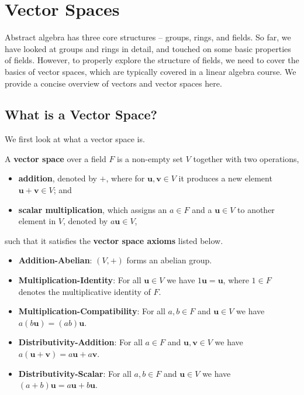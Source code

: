 \chapter{Vector Spaces}
Abstract algebra has three core structures -- groups, rings, and fields. So far, we have looked at groups and rings in detail, and touched on some basic properties of fields. However, to properly explore the structure of fields, we need to cover the basics of vector spaces, which are typically covered in a linear algebra course. We provide a concise overview of vectors and vector spaces here.

\section{What is a Vector Space?}
We first look at what a vector space is.
\begin{definition}
    A \textbf{vector space} over a field $F$ is a non-empty set $V$ together with two operations,
    \begin{itemize}
        \item \textbf{addition}, denoted by $+$, where for $\textbf{u}, \textbf{v} \in V$ it produces a new element $\textbf{u} + \textbf{v} \in V$; and
        \item \textbf{scalar multiplication}, which assigns an $a \in F$ and a $\textbf{u} \in V$ to another element in $V$, denoted by $a\textbf{u} \in V$,
    \end{itemize}
    such that it satisfies the \textbf{vector space axioms} listed below.
    \begin{itemize}
        \item \textbf{Addition-Abelian}: $(V, +)$ forms an abelian group.
        \item \textbf{Multiplication-Identity}: For all $\textbf{u} \in V$ we have $1\textbf{u} = \textbf{u}$, where $1 \in F$ denotes the multiplicative identity of $F$.
        \item \textbf{Multiplication-Compatibility}: For all $a,b  \in F$ and $\textbf{u} \in V$ we have $a(b\textbf{u}) = (ab)\textbf{u}$.
        \item \textbf{Distributivity-Addition}: For all $a \in F$ and $\textbf{u}, \textbf{v} \in V$ we have $a(\textbf{u} + \textbf{v}) = a\textbf{u} + a\textbf{v}$.
        \item \textbf{Distributivity-Scalar}: For all $a, b \in F$ and $\textbf{u} \in V$ we have $(a+b)\textbf{u} = a\textbf{u} + b\textbf{u}$.
    \end{itemize}
\end{definition}

